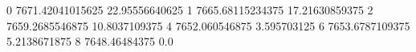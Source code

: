 0 7671.42041015625 22.95556640625
1 7665.68115234375 17.21630859375
2 7659.2685546875 10.8037109375
4 7652.060546875 3.595703125
6 7653.6787109375 5.2138671875
8 7648.46484375 0.0
